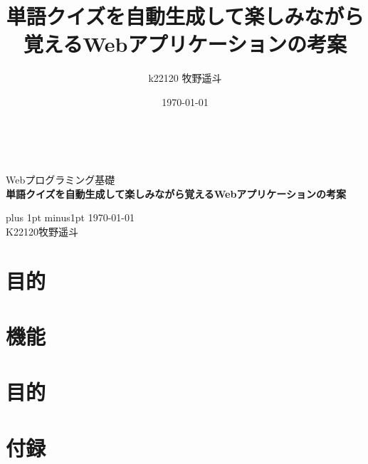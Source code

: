 \documentclass[11pt,a4paper]{jsarticle}
\title{単語クイズを自動生成して楽しみながら覚えるWebアプリケーションの考案}
\author{k22120 牧野遥斗}
\date{\today}
\begin{document}
\begin{titlepage}
  \begin{center}

      \ \vspace{19mm}

      \LARGE\baselineskip=13mm
        Webプログラミング基礎\\[1mm]
      {\Huge\baselineskip=13mm
      \textbf{単語クイズを自動生成して楽しみながら覚えるWebアプリケーションの考案} \\
      }

      \vspace{80mm}

      \kanjiskip=9pt plus 1pt minus1pt
      \today \\
      K22120\hspace{1zw}牧野遥斗 \\
  \end{center}
\end{titlepage}

\section{目的}

\section{機能}

\section{目的}

\section{付録}
\end{document}
